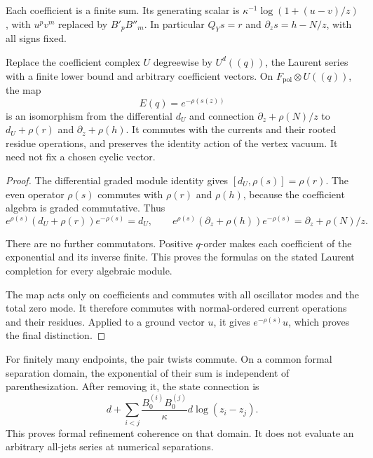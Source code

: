 Each coefficient is a finite sum. Its generating scalar is
\(\kappa^{-1}\log(1+(u-v)/z)\), with \(u^p v^m\) replaced by \(B'_pB''_m\).
In particular \(Q_Ys=r\) and \(\partial_zs=h-N/z\), with all signs fixed.

\begin{theorem}
\label{v4-arith:cs:thm:formal-sewing}
Replace the coefficient complex \(U\) degreewise by \(U^d((q))\), the
Laurent series with a finite lower bound and arbitrary coefficient vectors.
On \(F_{\mathrm{pol}}\otimes U((q))\), the map
\begin{equation}
 E(q)=e^{-\rho(s(z))}
 \label{v4-arith:cs:eq:sewing-map}
\end{equation}
is an isomorphism from the differential \(d_U\) and connection
\(\partial_z+\rho(N)/z\) to \(d_U+\rho(r)\) and \(\partial_z+\rho(h)\). It
commutes with the currents and their rooted residue operations, and
preserves the identity action of the vertex vacuum. It need not fix a chosen
cyclic vector.
\end{theorem}

\begin{proof}
The differential graded module identity gives \([d_U,\rho(s)]=\rho(r)\). The
even operator \(\rho(s)\) commutes with \(\rho(r)\) and \(\rho(h)\), because
the coefficient algebra is graded commutative. Thus
\[
 e^{\rho(s)}(d_U+\rho(r))e^{-\rho(s)}=d_U,
 \qquad
 e^{\rho(s)}(\partial_z+\rho(h))e^{-\rho(s)}
                         =\partial_z+\rho(N)/z.
\]

There are no further commutators. Positive \(q\)-order makes each
coefficient of the exponential and its inverse finite. This proves the
formulas on the stated Laurent completion for every algebraic module.

The map acts only on coefficients and commutes with all oscillator modes and
the total zero mode. It therefore commutes with normal-ordered current
operations and their residues. Applied to a ground vector \(u\), it gives
\(e^{-\rho(s)}u\), which proves the final distinction.
\end{proof}

For finitely many endpoints, the pair twists commute. On a common formal
separation domain, the exponential of their sum is independent of
parenthesization. After removing it, the state connection is
\[
 d+\sum_{i<j}\frac{B^{(i)}_0B^{(j)}_0}{\kappa}
                                      d\log(z_i-z_j).
\]
This proves formal refinement coherence on that domain. It does not evaluate
an arbitrary all-jets series at numerical separations.

